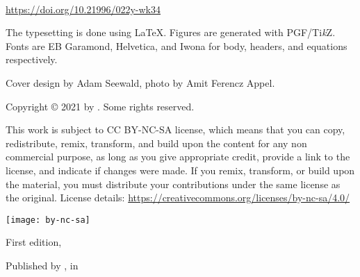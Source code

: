 
{\small\setlength{\parindent}{0em}\setlength{\parskip}{1em}
~

\vfill

\url{https://doi.org/10.21996/022y-wk34}

The typesetting is done using \LaTeX. Figures are generated with PGF/Ti\textit{k}Z. Fonts are EB Garamond, Helvetica, and Iwona for body, headers, and equations respectively.

Cover design by Adam Seewald, photo by Amit Ferencz Appel.

Copyright \copyright{} 2021 by \authorname. Some rights reserved.

This work is subject to CC BY-NC-SA license, which means that you can copy, redistribute, remix, transform, and build upon the content for any non commercial purpose, as long as you give appropriate credit, provide a link to the license, and indicate if changes were made. If you remix, transform, or build upon the material, you must distribute your contributions under the same license as the original. License details: \url{https://creativecommons.org/licenses/by-nc-sa/4.0/}

\texttt{[image: by-nc-sa]}

First edition, \editionyear{}


Published by \publisher{}, in \place{}
}\cleardoublepage
